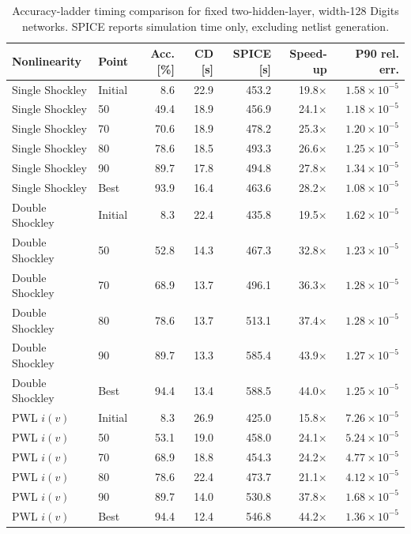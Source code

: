 \begin{table}[t]
\centering
\small
\setlength{\tabcolsep}{5pt}
\begin{tabular}{llrrrrr}
\toprule
Nonlinearity & Point & Acc. [\%] & CD [s] & SPICE [s] & Speed-up & P90 rel. err.\\
\midrule
Single Shockley & Initial & 8.6 & 22.9 & 453.2 & 19.8$\times$ & $1.58\times 10^{-5}$\\
Single Shockley & 50 & 49.4 & 18.9 & 456.9 & 24.1$\times$ & $1.18\times 10^{-5}$\\
Single Shockley & 70 & 70.6 & 18.9 & 478.2 & 25.3$\times$ & $1.20\times 10^{-5}$\\
Single Shockley & 80 & 78.6 & 18.5 & 493.3 & 26.6$\times$ & $1.25\times 10^{-5}$\\
Single Shockley & 90 & 89.7 & 17.8 & 494.8 & 27.8$\times$ & $1.34\times 10^{-5}$\\
Single Shockley & Best & 93.9 & 16.4 & 463.6 & 28.2$\times$ & $1.08\times 10^{-5}$\\
\addlinespace
Double Shockley & Initial & 8.3 & 22.4 & 435.8 & 19.5$\times$ & $1.62\times 10^{-5}$\\
Double Shockley & 50 & 52.8 & 14.3 & 467.3 & 32.8$\times$ & $1.23\times 10^{-5}$\\
Double Shockley & 70 & 68.9 & 13.7 & 496.1 & 36.3$\times$ & $1.28\times 10^{-5}$\\
Double Shockley & 80 & 78.6 & 13.7 & 513.1 & 37.4$\times$ & $1.28\times 10^{-5}$\\
Double Shockley & 90 & 89.7 & 13.3 & 585.4 & 43.9$\times$ & $1.27\times 10^{-5}$\\
Double Shockley & Best & 94.4 & 13.4 & 588.5 & 44.0$\times$ & $1.25\times 10^{-5}$\\
\addlinespace
PWL \(i(v)\) & Initial & 8.3 & 26.9 & 425.0 & 15.8$\times$ & $7.26\times 10^{-5}$\\
PWL \(i(v)\) & 50 & 53.1 & 19.0 & 458.0 & 24.1$\times$ & $5.24\times 10^{-5}$\\
PWL \(i(v)\) & 70 & 68.9 & 18.8 & 454.3 & 24.2$\times$ & $4.77\times 10^{-5}$\\
PWL \(i(v)\) & 80 & 78.6 & 22.4 & 473.7 & 21.1$\times$ & $4.12\times 10^{-5}$\\
PWL \(i(v)\) & 90 & 89.7 & 14.0 & 530.8 & 37.8$\times$ & $1.68\times 10^{-5}$\\
PWL \(i(v)\) & Best & 94.4 & 12.4 & 546.8 & 44.2$\times$ & $1.36\times 10^{-5}$\\
\bottomrule
\end{tabular}
\caption{Accuracy-ladder timing comparison for fixed two-hidden-layer, width-128 Digits networks. SPICE reports simulation time only, excluding netlist generation.}
\label{tab:accuracy_ladder_timing}
\end{table}
